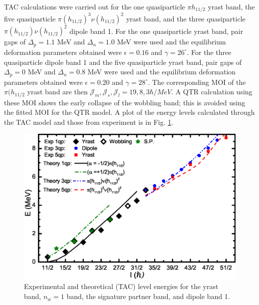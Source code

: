 TAC calculations were carried out for the one quasiparticle $\pi{}h_{11/2}$ yrast band, the five quasiparticle $\pi(h_{11/2})^3\nu(h_{11/2})^2$ yrast band, and the three quasiparticle $\pi(h_{11/2})\nu(h_{11/2})^2$ dipole band 1. For the one quasiparticle yrast band, pair gaps of $\Delta_p=1.1$ MeV and $\Delta_n=1.0$ MeV were used and the equilibrium deformation parameters obtained were $\epsilon=0.16$ and $\gamma=26^{\circ}$. For the three quasiparticle dipole band 1 and the five quasiparticle yrast band, pair gaps of $\Delta_p=0$ MeV and $\Delta_n=0.8$ MeV were used and the equilibrium deformation parameters obtained were $\epsilon=0.20$ and $\gamma=28^{\circ}$. The corresponding MOI of the $\pi(h_{11/2}$ yrast band are then $\mathcal{J}_m,\mathcal{J}_s,\mathcal{J}_l = 19, 8, 3 \hbar{}/MeV$. A QTR calculation using these MOI shows the early collapse of the wobbling band; this is avoided using the fitted MOI for the QTR model. A plot of the energy levels calculated through the TAC model and those from experiment is in Fig. \ref{fig:chp4-TAC-en}.

\begin{figure}[t!]
\centerline{\includegraphics[width=\textwidth]{./img/c4/evj_new_yrast.eps}}
	\caption{Experimental and theoretical (TAC) level energies for the yrast band, $n_w=1$ band, the signature partner band, and dipole band 1. \label{fig:chp4-TAC-en}}
\end{figure}

